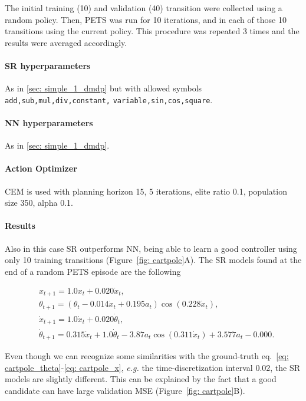 \documentclass[11pt]{article}
\begin{document}
The initial training (10) and validation (40) transition were collected using a random policy. Then, PETS was run for 10 iterations, and in each of those 10 transitions using the current policy. This procedure was repeated 3 times and the results were averaged accordingly.

\paragraph{SR hyperparameters} As in \ref{sec: simple_1_dmdp} but with allowed symbols \texttt{add,sub,mul,div,constant,} \texttt{variable,sin,cos,square}.

\paragraph{NN hyperparameters} As in \ref{sec: simple_1_dmdp}.

\paragraph{Action Optimizer} CEM is used with planning horizon 15, 5 iterations, elite ratio 0.1, population size 350, alpha 0.1.

\paragraph{Results} Also in this case SR outperforms NN, being able to learn a good controller using only 10 training transitions (Figure~\ref{fig: cartpole}A). The SR models found at the end of a random PETS episode are the following

\begin{align}
	&x_{t+1} = 1.0x_t + 0.020\dot{x}_t,\\
	&\theta_{t+1}=(\theta_t - 0.014\dot{x}_t + 0.195a_t)\cos(0.228\dot{x}_t),\\
	&\dot{x}_{t+1} = 1.0\dot{x}_t + 0.020 \dot{\theta}_t,\\
	&\dot{\theta}_{t+1} = 0.315\dot{x}_t +1.0\dot{\theta}_t - 3.87a_t\cos(0.311\dot{x}_t) + 3.577a_t - 0.000.
\end{align}

Even though we can recognize some similarities with the ground-truth eq.~\eqref{eq: cartpole_theta}-\eqref{eq: cartpole_x}, \textsl{e.g.} the time-discretization interval 0.02, the SR models are slightly different. This can be explained by the fact that a good candidate can have large validation MSE (Figure~\ref{fig: cartpole}B).
\end{document}
